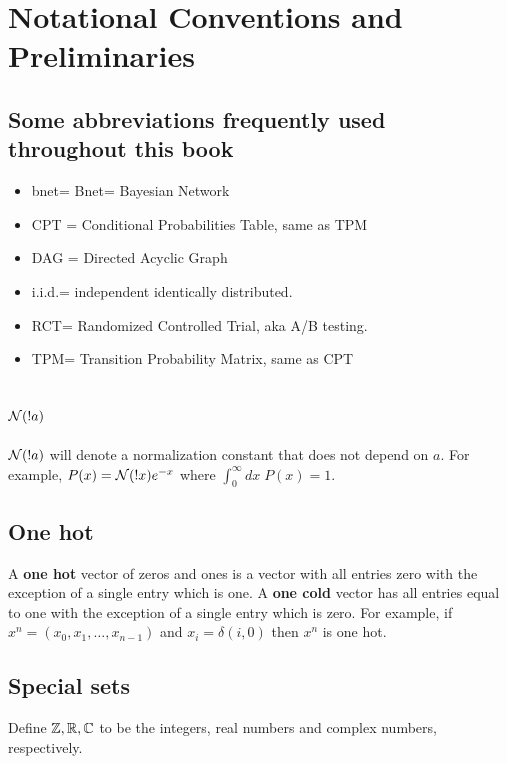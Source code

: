 \chapter*{Notational Conventions and Preliminaries}

\label{ch-conventions}
\section{Some abbreviations frequently
used throughout this book}

\begin{itemize}
\item
bnet= Bnet= Bayesian Network
\item
CPT = Conditional Probabilities Table,
 same as TPM
\item
DAG = Directed Acyclic Graph
\item
i.i.d.= independent identically 
distributed.
 \item
 RCT= Randomized Controlled Trial,
aka A/B testing.

\item
TPM= Transition Probability Matrix,
same as CPT

\end{itemize}

\section{${\cal N}(!a)$}
${\cal N}(!a)$ will denote 
a normalization constant that does not depend
on $a$. For example, $P(x)={\cal N}(!x)e^{-x}$
where $\int_0^\infty dx \;P(x)=1$.

\section{One hot}
A {\bf one hot } vector of zeros and 
ones is a vector with all entries 
zero with
the exception of a single entry which is one.
A {\bf one cold} vector has all entries
equal to one with the exception of  a
single entry which is zero.
For example, if $x^n=(x_0, x_1, \ldots,
x_{n-1})$ and
$x_i=\delta(i,0)$ then $x^n$ is one hot.


\section{Special sets}
Define ${\mathbb{Z}}, { \mathbb{R}}, { \mathbb{C}}$ to be
 the integers, real numbers
 and complex numbers, respectively. 

